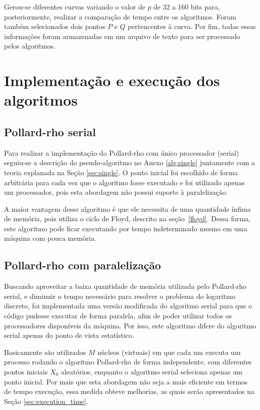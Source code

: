 Gerou-se diferentes curvas variando o valor de \(p\) de 32 a 160 bits para, posteriormente, realizar a comparação de tempo entre os algoritmos. Foram também selecionados dois pontos \(P\) e \(Q\) pertencentes à curva. Por fim, todas essas informações foram armazenadas em um arquivo de texto para ser processado pelos algoritmos.

\section{Implementação e execução dos algoritmos}

\subsection{Pollard-rho serial}
Para realizar a implementação do Pollard-rho com único processador (serial) seguiu-se a descrição do pseudo-algoritmo no Anexo \ref{alg:single} juntamente com a teoria explanada na Seção \ref{sec:single}. O ponto inicial foi escolhido de forma arbitrária para cada vez que o algoritmo fosse executado e foi utilizado apenas um processador, pois esta abordagem não possui suporte à paralelização.

A maior vantagem desse algoritmo é que ele necessita de uma quantidade ínfima de memória, pois utiliza o ciclo de Floyd, descrito na seção~\ref{floyd}. Dessa forma, este algoritmo pode ficar executando por tempo indeterminado mesmo em uma máquina com pouca memória.

\subsection{Pollard-rho com paralelização}
Buscando aproveitar a baixa quantidade de memória utilizada pelo Pollard-rho serial, e diminuir o tempo necessário para resolver o problema do logaritmo discreto, foi implementada uma versão modificada do algoritmo serial para que o código pudesse executar de forma paralela, afim de poder utilizar todos os processadores disponíveis da máquina. Por isso, este algoritmo difere do algoritmo serial apenas do ponto de vista estatístico.

Basicamente são utilizados \(M\) núcleos (virtuais) em que cada um executa um processo rodando o algoritmo Pollard-rho de forma independente, com diferentes pontos iniciais \(X_0\) aleatórios, enquanto o algoritmo serial seleciona apenas um ponto inicial. Por mais que esta abordagem não seja a mais eficiente em termos de tempo execução, essa medida obteve melhorias, as quais serão apresentados na Seção \ref{sec:execution_time}.

